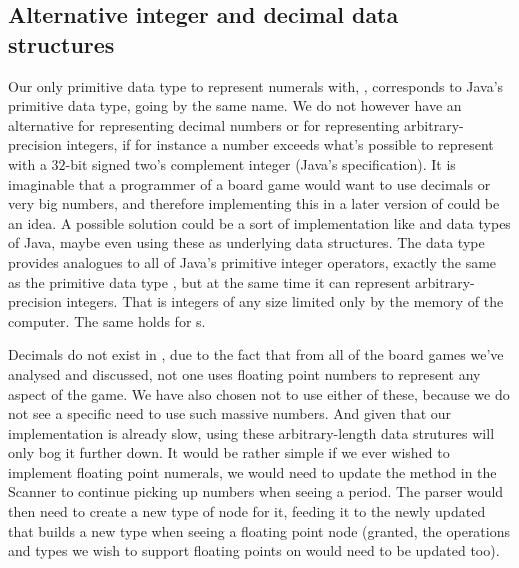 \subsection{Alternative integer and decimal data structures}
\label{sec:bigintegers}

Our only primitive data type to represent numerals with, ,
corresponds to Java's primitive data type, going by the same name. We
do not however have an alternative for representing decimal numbers
or for representing arbitrary-precision integers, if for instance a
number exceeds what's possible to represent with a $32$-bit signed
two's complement integer (Java's specification). It is imaginable
that a programmer of a board game would want to use decimals or very
big numbers, and therefore implementing this in a later version of
\productname{} could be an idea. A possible solution could be a sort of
implementation like  and  data
types of Java, maybe even using these as underlying data structures.
The  data type provides analogues to all of Java's
primitive integer operators, exactly the same as the primitive data
type \cite{javabigint}, but at the same time it
can represent arbitrary-precision integers. That is integers of any
size limited only by the memory of the computer. The same holds for
s.

Decimals do not exist in \productname{}, due to the fact that from all
of the board games we've analysed and discussed, not one uses floating
point numbers to represent any aspect of the game. We have also chosen
not to use either of these, because we do not see a specific need to use
such massive numbers. And given that our \productname{} implementation
is already slow, using these arbitrary-length data strutures will
only bog it further down. It would be rather simple if we ever wished
to implement floating point numerals, we would need to update the
 method in the Scanner to continue picking up numbers
when seeing a period. The parser would then need to create a new type
of node for it, feeding it to the newly updated  that builds
a new type when seeing a floating point node (granted, the operations
and types we wish to support floating points on would need to be updated
too).
